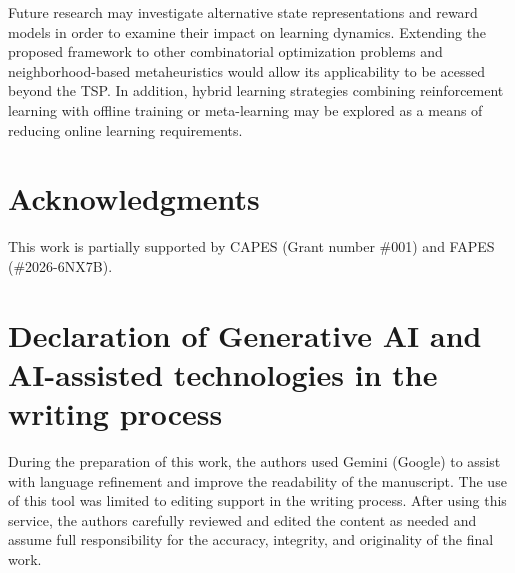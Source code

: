 \documentclass[runningheads]{llncs}
\begin{document}
Future research may investigate alternative state representations and reward models in order to examine their impact on learning dynamics. Extending the proposed framework to other combinatorial optimization problems and neighborhood-based metaheuristics would allow its applicability to be acessed beyond the TSP. In addition, hybrid learning strategies combining reinforcement learning with offline training or meta-learning may be explored as a means of reducing online learning requirements.


\section*{Acknowledgments}

This work is partially supported by CAPES (Grant number \#001) and FAPES (\#2026-6NX7B).

\section*{Declaration of Generative AI and AI-assisted technologies in the
writing process}

During the preparation of this work, the authors used Gemini (Google) to assist with language refinement and improve the readability of the manuscript. The use of this tool was limited to editing support in the writing process. After using this service, the authors carefully reviewed and edited the content as needed and assume full responsibility for the accuracy, integrity, and originality of the final work.

%
%
%


\end{document}
